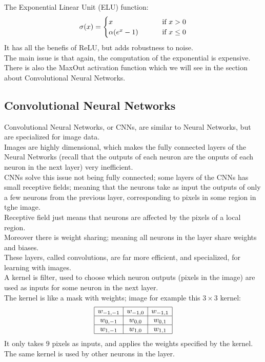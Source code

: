 \documentclass[12pt]{article}
\begin{document}
The Exponential Linear Unit (ELU) function:
\[ \sigma(x) = \begin{cases} 
    x \qquad & \text{ if } x > 0 \\
    \alpha (e^{x}-1) \qquad & \text{ if } x \leq 0 
 \end{cases} \]
It has all the benefis of ReLU,
but adds robustness to noise. \\
The main issue is that again, the computation
of the exponential is expensive. \\

There is also the MaxOut activation function which
we will see in the section about Convolutional
Neural Networks. \\


\newpage

\subsection*{Convolutional Neural Networks}

Convolutional Neural Networks, or CNNs,
are similar to Neural Networks, but are specialized
for image data. \\

Images are highly dimensional, which makes
the fully connected layers of the Neural Networks
(recall that the outputs of each neuron are
the onputs of each neuron in the next layer)
very inefficient. \\

CNNs solve this issue not being fully connected;
some layers of the CNNs has small receptive fields;
meaning that the neurons take as input the outputs
of only a few neurons from the previous layer,
corresponding to pixels in some region in tghe image. \\
Receptive field just means that neurons are affected
by the pixels of a local region. \\
Moreover there is weight sharing; meaning all neurons
in the layer share weights and biases. \\
These layers, called convolutions, are far
more efficient, and specialized, for learning
with images. \\

A kernel is filter, used to choose
which neuron outputs (pixels in the image)
are used as inputs for some neuron in the next layer. \\
The kernel is like a mask with weights;
image for example this $3\times3$ kernel:
\[ \begin{array}{|c|c|c|}
\hline
w_{-1,-1} & w_{-1,0} & w_{-1,1} \\
\hline
w_{0,-1} & w_{0,0} & w_{0,1} \\
\hline
w_{1,-1} & w_{1,0} & w_{1,1} \\
\hline
\end{array} \]
It only takes $9$ pixels as inputs,
and applies the weights specified by the kernel.
The same kernel is used by other neurons in the
layer. \\
\end{document}
